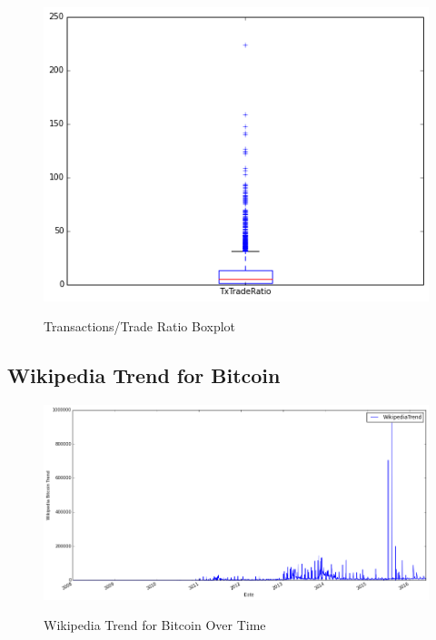 \begin{figure}[bth]
  \myfloatalign
  {\includegraphics[width=1\linewidth]
    {gfx/tx-trade-ratio-boxplot}}
  \caption{Transactions/Trade Ratio
    Boxplot}
  \label{fig:tx-trade-ratio-boxplot}
\end{figure}

\clearpage

\subsection{Wikipedia Trend for Bitcoin}
\label{sec:wikipedia-trend-for-bitcoin}

\begin{figure}[bth]
  \myfloatalign
  {\includegraphics[width=1\linewidth]
    {gfx/wikipedia-trend-for-bitcoin-over-time}}
  \caption{Wikipedia Trend for Bitcoin
    Over Time}
  \label{fig:wikipedia-trend-for-bitcoin-over-time}
\end{figure}

